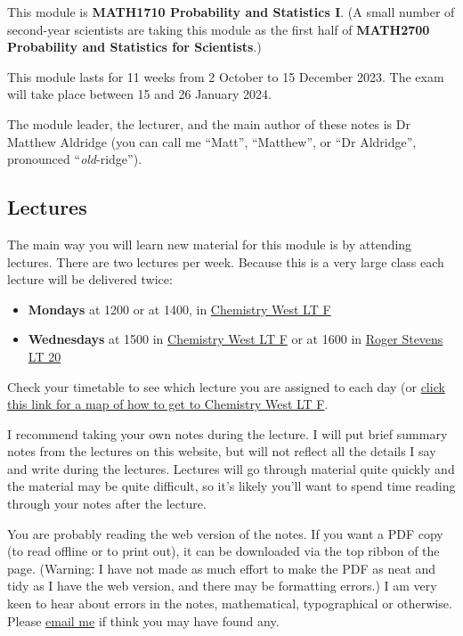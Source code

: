 \documentclass[
  a4paper,
]{book}
\providecommand{\tightlist}{%
  \setlength{\itemsep}{0pt}\setlength{\parskip}{0pt}}
\theoremstyle{definition}
\theoremstyle{definition}
\theoremstyle{definition}
\theoremstyle{definition}
\theoremstyle{remark}
\begin{document}
This module is \textbf{MATH1710 Probability and Statistics I}. (A small number of second-year scientists are taking this module as the first half of \textbf{MATH2700 Probability and Statistics for Scientists}.)

This module lasts for 11 weeks from 2 October to 15 December 2023. The exam will take place between 15 and 26 January 2024.

The module leader, the lecturer, and the main author of these notes is Dr Matthew Aldridge (you can call me ``Matt'', ``Matthew'', or ``Dr Aldridge'', pronounced ``\emph{old}-ridge'').

\hypertarget{lectures}{%
\subsection*{Lectures}\label{lectures}}

The main way you will learn new material for this module is by attending lectures. There are two lectures per week. Because this is a very large class each lecture will be delivered twice:

\begin{itemize}
\tightlist
\item
  \textbf{Mondays} at 1200 or at 1400, in \href{chem-west-map.png}{Chemistry West LT F}
\item
  \textbf{Wednesdays} at 1500 in \href{chem-west-map.png}{Chemistry West LT F} or at 1600 in \href{https://students.leeds.ac.uk/rooms?type=room\&id=100044}{Roger Stevens LT 20}
\end{itemize}

Check your timetable to see which lecture you are assigned to each day (or \href{(chem-west-map.png)}{click this link for a map of how to get to Chemistry West LT F}.

I recommend taking your own notes during the lecture. I will put brief summary notes from the lectures on this website, but will not reflect all the details I say and write during the lectures. Lectures will go through material quite quickly and the material may be quite difficult, so it's likely you'll want to spend time reading through your notes after the lecture.

You are probably reading the web version of the notes. If you want a PDF copy (to read offline or to print out), it can be downloaded via the top ribbon of the page. (Warning: I have not made as much effort to make the PDF as neat and tidy as I have the web version, and there may be formatting errors.) I am very keen to hear about errors in the notes, mathematical, typographical or otherwise. Please \href{mailto:m.aldridge@leeds.ac.uk}{email me} if think you may have found any.
\end{document}
